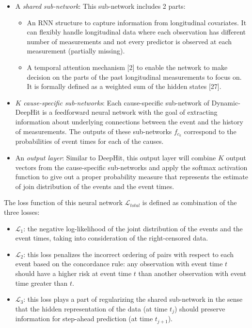 \documentclass[
]{article}
\providecommand{\tightlist}{%
  \setlength{\itemsep}{0pt}\setlength{\parskip}{0pt}}
\begin{document}
\begin{itemize}
\tightlist
\item
  A \emph{shared sub-network}: This sub-network includes 2 parts:

  \begin{itemize}
  \tightlist
  \item
    An RNN structure to capture information from longitudinal covariates. It can flexibly handle longitudinal data where each observation has different number of measurements and not every predictor is observed at each measurement (partially missing).
  \item
    A temporal attention mechanism {[}2{]} to enable the network to make decision on the parts of the past longitudinal measurements to focus on. It is formally defined as a weighted sum of the hidden states {[}27{]}.
  \end{itemize}
\item
  \(K\) \emph{cause-specific sub-networks}: Each cause-specific sub-network of Dynamic-DeepHit is a feedforward neural network with the goal of extracting information about underlying connections between the event and the history of measurements. The outputs of these sub-networks \(f_{c_k}\) correspond to the probabilities of event times for each of the causes.
\item
  An \emph{output layer}: Similar to DeepHit, this output layer will combine \(K\) output vectors from the cause-specific sub-networks and apply the softmax activation function to give out a proper probability measure that represents the estimate of join distribution of the events and the event times.
\end{itemize}

The loss function of this neural network \(\mathcal{L}_{total}\) is defined as combination of the three losses:
\vspace{-0.45cm}

\begin{itemize}
\tightlist
\item
  \(\mathcal{L}_1\): the negative log-likelihood of the joint distribution of the events and the event times, taking into consideration of the right-censored data.
\item
  \(\mathcal{L}_2\): this loss penalizes the incorrect ordering of pairs with respect to each event based on the concordance rule: any observation with event time \(t\) should have a higher risk at event time \(t\) than another observation with event time greater than \(t\).
\item
  \(\mathcal{L}_3\): this loss plays a part of regularizing the shared sub-network in the sense that the hidden representation of the data (at time \(t_j\)) should preserve information for step-ahead prediction (at time \(t_{j + 1}\)).
\end{itemize}
\end{document}
